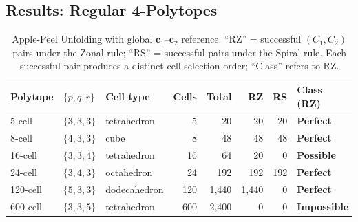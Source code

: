\documentclass[12pt]{article}
\theoremstyle{definition}
\begin{document}
\subsection{Results: Regular 4-Polytopes}
\label{sec:4dresults}

\begin{table}[ht]
\centering
\caption{Apple-Peel Unfolding with global $\mathbf{c}_1$--$\mathbf{c}_2$ reference.
  ``RZ'' = successful $(C_1,C_2)$ pairs under the Zonal rule;
  ``RS'' = successful pairs under the Spiral rule.
  Each successful pair produces a distinct cell-selection order;
  ``Class'' refers to RZ.}
\label{tab:4dglobal}
\renewcommand{\arraystretch}{1.2}
\begin{tabular}{lllrrrrl}
\toprule
Polytope & $\{p,q,r\}$ & Cell type & Cells & Total & RZ & RS & Class (RZ) \\
\midrule
5-cell   & $\{3,3,3\}$ & tetrahedron  &   5 &    20 &   20 &     20 & \textbf{Perfect}    \\
8-cell   & $\{4,3,3\}$ & cube         &   8 &    48 &   48 &     48 & \textbf{Perfect}    \\
16-cell  & $\{3,3,4\}$ & tetrahedron  &  16 &    64 &   20 &      0 & \textbf{Possible}   \\
24-cell  & $\{3,4,3\}$ & octahedron   &  24 &   192 &  192 &    192 & \textbf{Perfect}    \\
120-cell & $\{5,3,3\}$ & dodecahedron & 120 & 1{,}440 & 1{,}440 &      0 & \textbf{Perfect}    \\
600-cell & $\{3,3,5\}$ & tetrahedron  & 600 & 2{,}400 &      0 &      0 & \textbf{Impossible} \\
\bottomrule
\end{tabular}
\end{table}
\end{document}
